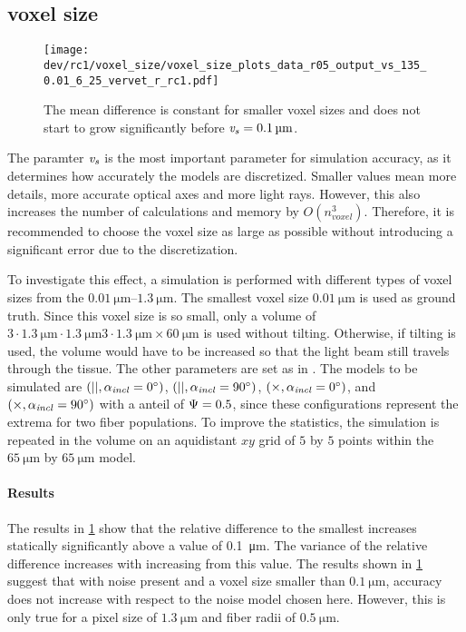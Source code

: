 \subsection{voxel size \texorpdfstring{\voxels{}}{}}
% 
% 
\begin{figure}[!t]%
\centering
\texttt{[image: dev/rc1/voxel\_size/voxel\_size\_plots\_data\_r05\_output\_vs\_135\_0.01\_6\_25\_vervet\_r\_rc1.pdf]}
\caption[voxel size model with noise]{The mean difference is constant for smaller voxel sizes and does not start to grow significantly before $\voxels=\SI{0.1}{\micro\meter}$.}
\label{fig:voxelsizeNoise}
\end{figure}
% 
The \voxelsize{} paramter $\textnormal{$\mathit{v_{s}}$}$ is the most important parameter for simulation accuracy, as it determines how accurately the models are discretized.
Smaller values mean more details, more accurate optical axes and more light rays.
However, this also increases the number of calculations and memory by $O(n_{\mathit{voxel}}^3)$.
Therefore, it is recommended to choose the voxel size as large as possible without introducing a significant error due to the discretization.
\par
% 
To investigate this effect, a simulation is performed with different types of voxel sizes from the $\SIrange{0.01}{1.3}{\micro\meter}$.
The smallest voxel size $\SI{0.01}{\micro\meter}$ is used as ground truth. 
Since this voxel size is so small, only a volume of $3 \cdot \SI{1.3}{\micro\meter} \cdot \SI{1.3}{\micro\meter} 3 \cdot \SI{1.3}{\micro\meter} \times \SI{60}{\micro\meter}$ is used without tilting.
Otherwise, if tilting is used, the volume would have to be increased so that the light beam still travels through the tissue.
The other parameters are set as in \dummy{}.
The models to be simulated are $(||,\textnormal{$\alpha_{\mathit{incl}}$} = \SI{0}{\degree})$, $(||,\textnormal{$\alpha_{\mathit{incl}}$} = \SI{90}{\degree})$, $(\times,\textnormal{$\alpha_{\mathit{incl}}$} = \SI{0}{\degree})$, and $(\times,\textnormal{$\alpha_{\mathit{incl}}$} = \SI{90}{\degree})$ with a anteil of $\textnormal{$\Psi$} = \SI{0.5}{}$, since these configurations represent the extrema for two fiber populations.
To improve the statistics, the simulation is repeated in the volume on an aquidistant $xy$ grid of $\num{5}$ by $\num{5}$ points within the $\SI{65}{\micro\meter}$ by $\SI{65}{\micro\meter}$ model.
% 
\paragraph{Results}
The results in \cref{fig:voxelsizeNoise} show that the relative difference to the smallest \voxelsize{} increases statically significantly above a value of \SI{0.1}{\micro\meter}.
The variance of the relative difference increases with increasing \voxelsize{} from this value.
% 
The results shown in \cref{fig:voxelsizeNoise} suggest that with noise present and a voxel size smaller than $\SI{0.1}{\micro\meter}$, accuracy does not increase with respect to the noise model chosen here.
However, this is only true for a pixel size of $\SI{1.3}{\micro\meter}$ and fiber radii of $\SI{0.5}{\micro\meter}$.
%  
% 
% 
